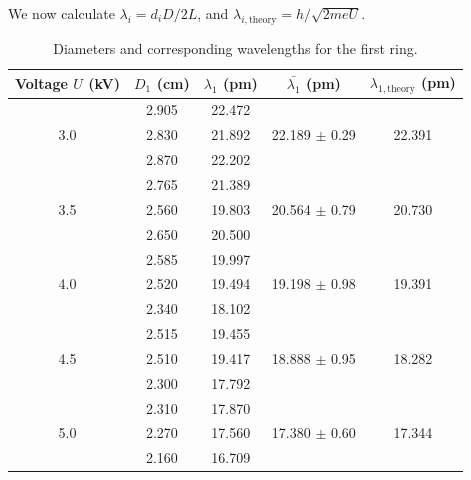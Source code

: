 \documentclass[11pt]{article}
\begin{document}
        We now calculate $\lambda_i = d_i D / 2L$, and $\lambda_{i,\text{theory}} = h /\sqrt{2 m e U}$.
        \begin{table}[H]
                \centering
                \caption{Diameters and corresponding wavelengths for the first ring.}
                \label{tab:ring_1}
                \begin{tabular}{c|c|c|c|c}\hline
                Voltage $U$ (kV) & $D_1$ (cm)    & $\lambda_1$ (pm)& $\bar{\lambda_1}$ (pm) &$\lambda_{1,\text{theory}}$ (pm) \\\hline\hline
                                 & 2.905         &  22.472         &                    &           \\
                3.0              & 2.830         &  21.892         & 22.189 $\pm$ 0.29  &  22.391   \\
                                 & 2.870         &  22.202         &                    &           \\\hline
                                 & 2.765         &  21.389         &                    &           \\
                3.5              & 2.560         &  19.803         & 20.564 $\pm$ 0.79  &  20.730   \\
                                 & 2.650         &  20.500         &                    &           \\\hline
                                 & 2.585         &  19.997         &                    &           \\
                4.0              & 2.520         &  19.494         & 19.198 $\pm$ 0.98  &  19.391   \\
                                 & 2.340         &  18.102         &                    &           \\\hline
                                 & 2.515         &  19.455         &                    &           \\
                4.5              & 2.510         &  19.417         & 18.888 $\pm$ 0.95  &  18.282   \\
                                 & 2.300         &  17.792         &                    &           \\\hline
                                 & 2.310         &  17.870         &                    &           \\
                5.0              & 2.270         &  17.560         & 17.380 $\pm$ 0.60  &  17.344   \\
                                 & 2.160         &  16.709         &                    &           \\\hline
                \end{tabular}
        \end{table}
\end{document}
